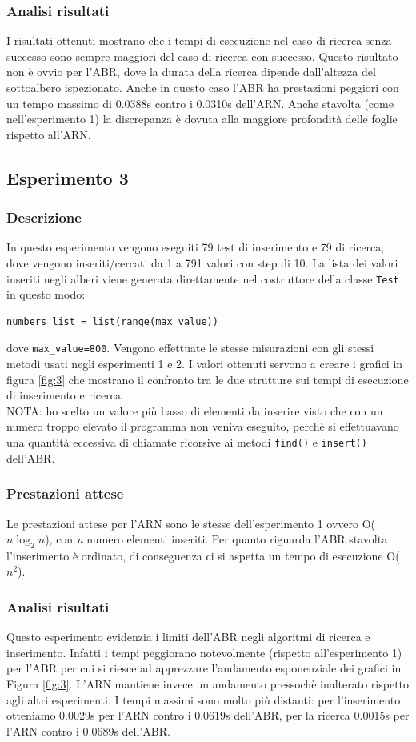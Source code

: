 \documentclass{article}
\begin{document}
\subsubsection{Analisi risultati}
I risultati ottenuti mostrano che i tempi di esecuzione nel caso di ricerca senza successo sono sempre maggiori del caso di ricerca con successo. Questo risultato non è ovvio per l'ABR, dove la durata della ricerca dipende dall'altezza del sottoalbero ispezionato. Anche in questo caso l'ABR ha prestazioni peggiori con un tempo massimo di 0.0388s contro i 0.0310s dell'ARN. Anche stavolta (come nell'esperimento 1) la discrepanza è dovuta alla maggiore profondità delle foglie rispetto all'ARN.
\subsection{Esperimento 3}
\subsubsection{Descrizione}
In questo esperimento vengono eseguiti 79 test di inserimento e 79 di ricerca, dove vengono inseriti/cercati da 1 a 791 valori con step di 10. La lista dei valori inseriti negli alberi viene generata direttamente nel costruttore della classe \verb|Test| in questo modo:
\begin{verbatim}
numbers_list = list(range(max_value))
\end{verbatim}
dove \verb|max_value=800|. Vengono effettuate le stesse misurazioni con gli stessi metodi usati negli esperimenti 1 e 2. I valori ottenuti servono a creare i grafici in figura \ref{fig:3} che mostrano il confronto tra le due strutture sui tempi di esecuzione di inserimento e ricerca.\\
NOTA: ho scelto un valore più basso di elementi da inserire visto che con un numero troppo elevato il programma non veniva eseguito, perchè si effettuavano una quantità eccessiva di chiamate ricorsive ai metodi \verb|find()| e \verb|insert()| dell'ABR.
\subsubsection{Prestazioni attese}
Le prestazioni attese per l'ARN sono le stesse dell'esperimento 1 ovvero O(${n\log_{2}{n}}$), con \emph{n} numero elementi inseriti. Per quanto riguarda l'ABR stavolta l'inserimento è ordinato, di conseguenza ci si aspetta un tempo di esecuzione O(${n^2}$).
\subsubsection{Analisi risultati}
Questo esperimento evidenzia i limiti dell'ABR negli algoritmi di ricerca e inserimento. Infatti i tempi peggiorano notevolmente (rispetto all'esperimento 1) per l'ABR per cui si riesce ad apprezzare l'andamento esponenziale dei grafici in Figura \ref{fig:3}. L'ARN mantiene invece un andamento pressochè inalterato rispetto agli altri esperimenti. I tempi massimi sono molto più distanti: per l'inserimento otteniamo 0.0029s per l'ARN contro i 0.0619s dell'ABR, per la ricerca 0.0015s per l'ARN contro i 0.0689s dell'ABR.
\end{document}
